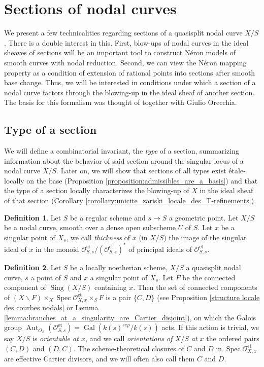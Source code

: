 \documentclass[a4paper,12pt]{amsart} %
\numberwithin{equation}{subsection}
\newcommand{\on}[1]{\operatorname{#1}}
\def\Sing{\operatorname{Sing}}
\newcommand{\Spec}{\operatorname{Spec}}
\theoremstyle{definition}
\newtheorem{definition}{Definition}[section]
\theoremstyle{plain}%
\theoremstyle{remark}
\renewcommand{\O}{\mathcal{O}}
\begin{document}
\section{Sections of nodal curves}

We present a few technicalities regarding sections of a quasisplit nodal curve $X/S$. There is a double interest in this. First, blow-ups of nodal curves in the ideal sheaves of sections will be an important tool to construct N\'eron models of smooth curves with nodal reduction. Second, we can view the N\'eron mapping property as a condition of extension of rational points into sections after smooth base change. Thus, we will be interested in conditions under which a section of a nodal curve factors through the blowing-up in the ideal sheaf of another section. The basis for this formalism was thought of together with Giulio Orecchia.

\subsection{Type of a section}

We will define a combinatorial invariant, the \emph{type} of a section, summarizing information about the behavior of said section around the singular locus of a nodal curve $X/S$. Later on, we will show that sections of all types exist \'etale-locally on the base (Proposition \ref{proposition:admissibles_are_a_basis}) and that the type of a section locally characterizes the blowing-up of $X$ in the ideal sheaf of that section (Corollary \ref{corollary:unicite_zariski_locale_des_T-refinements}).


\begin{definition}
Let $S$ be a regular scheme and $s\to S$ a geometric point. Let $X/S$ be a nodal curve, smooth over a dense open subscheme $U$ of $S$. Let $x$ be a singular point of $X_s$, we call \emph{thickness} of $x$ (in $X/S$) the image of the singular ideal of $x$ in the monoid $\O_{S,s}^{\on{et}}/(\O_{S,s}^{\on{et}})^*$ of principal ideals of $\O_{S,s}^{\on{et}}$.
\end{definition}



\begin{definition}\label{definition:orientation}
Let $S$ be a locally noetherian scheme, $X/S$ a quasisplit nodal curve, $s$ a point of $S$ and $x$ a singular point of $X_s$. Let $F$ be the connected component of $\Sing(X/S)$ containing $x$. Then the set of connected components of $(X\backslash F)\times_X \Spec \O_{X,x}^{\on{et}}\times_S F$ is a pair $\{C,D\}$ (see Proposition \ref{structure locale des courbes nodals} or Lemma \ref{lemma:branches_at_a_singularity_are_Cartier_disjoint}), on which the Galois group $\operatorname{Aut}_{O_S}(\O_{S,s}^{\on{et}})=\operatorname{Gal}(k(s)^{sep}/k(s))$ acts. If this action is trivial, we say $X/S$ is \emph{orientable at $x$}, and we call \emph{orientations of $X/S$ at $x$} the ordered pairs $(C,D)$ and $(D,C)$. The scheme-theoretical closures of $C$ and $D$ in $\Spec \O_{X,x}^{\on{et}}$ are effective Cartier divisors, and we will often also call them $C$ and $D$.
\end{definition}
\end{document}
